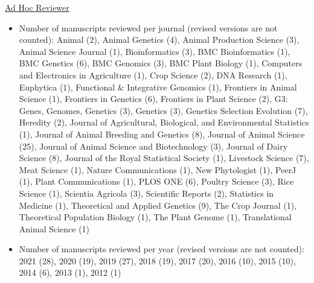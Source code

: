 \documentclass[margin,line,10pt]{res}
\newenvironment{list1}{
  \begin{list}{\ding{113}}{%
      \setlength{\itemsep}{0in}
      \setlength{\parsep}{0in} \setlength{\parskip}{0in}
      \setlength{\topsep}{0in} \setlength{\partopsep}{0in} 
      \setlength{\leftmargin}{0.17in}}}{\end{list}}
\begin{document}
\begin{resume}
\vspace{0.3cm}
\underline{Ad Hoc Reviewer}
\begin{itemize}
    \vspace{.1cm}
\item  Number of manuscripts reviewed per journal (revised versions are not counted): Animal (2), Animal Genetics (4), Animal Production Science (3), Animal Science Journal (1), Bioinformatics (3), BMC Bioinformatics (1), BMC Genetics (6), BMC Genomics (3), BMC Plant Biology (1), Computers and Electronics in Agriculture (1), Crop Science (2), DNA Research (1),  Euphytica (1), Functional \& Integrative Genomics (1), Frontiers in Animal Science (1), Frontiers in Genetics (6), Frontiers in Plant Science (2), G3: Genes, Genomes, Genetics (3), Genetics (3), Genetics Selection Evolution (7), Heredity (2), Journal of Agricultural, Biological, and Environmental Statistics (1), Journal of Animal Breeding and Genetics (8), Journal of Animal Science (25), Journal of Animal Science and Biotechnology (3), Journal of Dairy Science (8), Journal of the Royal Statistical Society (1), Livestock Science (7), Meat Science (1), Nature Communications (1), New Phytologist (1), PeerJ (1), Plant Communications (1), PLOS ONE (6), Poultry Science (3), Rice Science (1), Scientia Agricola (3), Scientific Reports (2), Statistics in Medicine (1), Theoretical and Applied Genetics (9), The Crop Journal (1), Theoretical Population Biology (1), The Plant Genome (1), Translational Animal Science (1)  
  \vspace{.1cm}
  \item Number of manuscripts reviewed per year (revised versions are not counted): 2021 (28), 2020 (19), 2019 (27), 2018 (19), 2017 (20), 2016 (10), 2015 (10), 2014 (6), 2013 (1), 2012 (1)
\end{itemize}

\begin{comment}
\vspace{0.5cm}
\section{\sc Manuscripts under review}

\begin{list1}


  \item [{\bf 28}.] Alghamdi S, Ha DS, \textbf{\underline{Morota G}} and Ha SS. 2022. Improved pig behavior analysis by optimizing window sizes for individual behaviors on acceleration and angular velocity data. \emph{}.     


\end{comment}
\end{resume}
\end{document}
